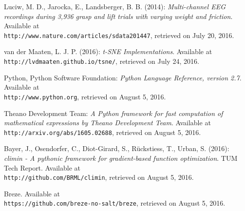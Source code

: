 \documentclass{article} %
\begin{document}
\begin{thebibliography}{9}
	Luciw, M. D., Jarocka, E., Landsberger, B. B. (2014): 
	\textit{Multi-channel EEG recordings during 3,936 grasp and lift trials with varying weight and friction}. 
	 Available at \\\texttt{http://www.nature.com/articles/sdata201447}, retrieved on July 20, 2016.
	
	van der Maaten, L. J. P. (2016): 
	\textit{t-SNE Implementations}.
	Available at \\\texttt{http://lvdmaaten.github.io/tsne/}, retrieved on July 24, 2016.
	
	Python, Python Software Foundation:
	\textit{Python Language Reference, version 2.7}.
	Available at \\\texttt{http://www.python.org}, retrieved on August 5, 2016.
	
	Theano Development Team:
	\textit{A Python framework for fast computation of mathematical expressions by Theano Development Team}.
	Available at \\\texttt{http://arxiv.org/abs/1605.02688}, retrieved on August 5, 2016.
	
	Bayer, J., Osendorfer, C., Diot-Girard, S., Rückstiess, T., Urban, S. (2016):
	\textit{climin - A pythonic framework for gradient-based function optimization}.
	 TUM Tech Report. Available at \\\texttt{http://github.com/BRML/climin}, retrieved on August 5, 2016.
	 
	 Breze.
	 Available at \\\texttt{https://github.com/breze-no-salt/breze}, retrieved on August 5, 2016.
\end{thebibliography}



\end{document}
